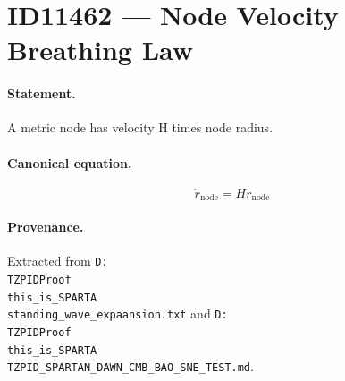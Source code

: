 \section*{ID11462 --- Node Velocity Breathing Law}

\paragraph{Statement.}
A metric node has velocity H times node radius.

\paragraph{Canonical equation.}
\[
\dot r_{\mathrm{node}}=H r_{\mathrm{node}}
\]

\paragraph{Provenance.}
Extracted from \texttt{D:\\TZPIDProof\\this\_is\_SPARTA\\standing\_wave\_expaansion.txt} and \texttt{D:\\TZPIDProof\\this\_is\_SPARTA\\TZPID\_SPARTAN\_DAWN\_CMB\_BAO\_SNE\_TEST.md}.
